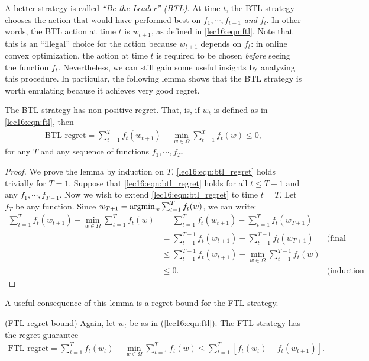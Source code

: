A better strategy is called \textit{``Be the Leader'' (BTL)}.  At time $t$, the BTL strategy chooses the action that would have performed best on $f_1, \cdots, f_{t-1}$ \textit{and} $f_t$.  In other words, the BTL action at time $t$ is $w_{t+1}$, as defined in \eqref{lec16:eqn:ftl}. Note that this is an ``illegal'' choice for the action because $w_{t+1}$ depends on $f_t$: in online convex optimization, the action at time $t$ is required to be chosen \textit{before} seeing the function $f_t$.  Nevertheless, we can still gain some useful insights by analyzing this procedure. In particular, the following lemma shows that the BTL strategy is worth emulating because it achieves very good regret.

\begin{lemma}\label{lec16:lem:btl_regret}
The BTL strategy has non-positive regret. That, is, if $w_t$ is defined as in \eqref{lec16:eqn:ftl}, then
\begin{align}
\text{BTL regret} = \sum_{t = 1}^T f_t(w_{t + 1}) - \min_{w \in \Omega} \sum_{t = 1}^T f_t(w) \leq 0, \label{lec16:eqn:btl_regret}
\end{align}
for any $T$ and any sequence of functions $f_1, \cdots, f_T$.
\end{lemma}

\begin{proof}
We prove the lemma by induction on $T$. \eqref{lec16:eqn:btl_regret} holds trivially for $T = 1$. Suppose that \eqref{lec16:eqn:btl_regret} holds for all $t \leq T - 1$ and any $f_1, \cdots, f_{T-1}$.  Now we wish to extend \eqref{lec16:eqn:btl_regret} to time $t = T$.  Let $f_T$ be any function.  Since $w_{T+1} = \operatorname*{\textup{argmin}}_w \sum_{t = 1}^T f_t(w)$, we can write:
\begin{align}
\sum_{t = 1}^{T} f_t(w_{t+1}) - \min_{w \in \Omega} \sum_{t = 1}^{T} f_t(w) &= \sum_{t = 1}^T f_t(w_{t+1}) - \sum_{t = 1}^T f_t(w_{T+1})\\
&= \sum_{t = 1}^{T - 1} f_t(w_{t+1}) - \sum_{t = 1}^{T - 1} f_t(w_{T+1}) &\text{(final summands cancel)}\\
&\leq \sum_{t = 1}^{T - 1} f_t(w_{t+1}) - \min_{w \in \Omega} \sum_{t = 1}^{T - 1} f_t(w)\\
&\leq 0. &\text{(induction hypothesis)}
\end{align}
\end{proof}

A useful consequence of this lemma is a regret bound for the FTL strategy.

\begin{lemma}
\label{lec16:lem:ftl_regret}
\textup{(FTL regret bound)} Again, let $w_t$ be as in (\ref{lec16:eqn:ftl}). The FTL strategy has the regret guarantee
\begin{align}
\text{FTL regret} = \sum_{t = 1}^T f_t(w_t) - \min_{w \in \Omega} \sum_{t = 1}^T f_t(w) \leq \sum_{t = 1}^T [f_t(w_t) - f_t(w_{t+1})].
\end{align}
\end{lemma}

